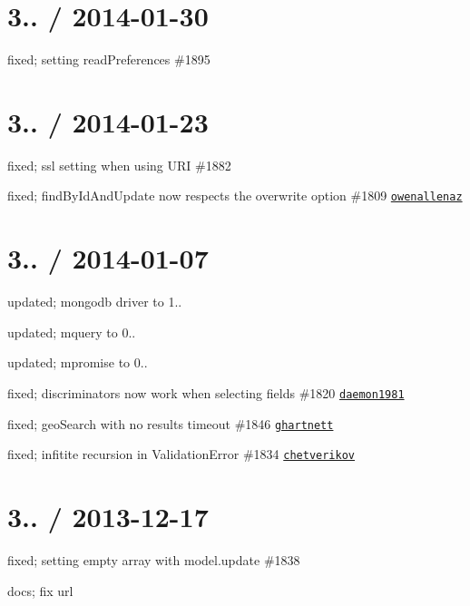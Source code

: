 \section*{3.. / 2014-\/01-\/30 }


\begin{DoxyItemize}
\item fixed; setting read\+Preferences \#1895
\end{DoxyItemize}

\section*{3.. / 2014-\/01-\/23 }


\begin{DoxyItemize}
\item fixed; ssl setting when using U\+RI \#1882
\item fixed; find\+By\+Id\+And\+Update now respects the overwrite option \#1809 \href{https://github.com/owenallenaz}{\tt owenallenaz}
\end{DoxyItemize}

\section*{3.. / 2014-\/01-\/07 }


\begin{DoxyItemize}
\item updated; mongodb driver to 1..
\item updated; mquery to 0..
\item updated; mpromise to 0..
\item fixed; discriminators now work when selecting fields \#1820 \href{https://github.com/daemon1981}{\tt daemon1981}
\item fixed; geo\+Search with no results timeout \#1846 \href{https://github.com/ghartnett}{\tt ghartnett}
\item fixed; infitite recursion in Validation\+Error \#1834 \href{https://github.com/chetverikov}{\tt chetverikov}
\end{DoxyItemize}

\section*{3.. / 2013-\/12-\/17 }


\begin{DoxyItemize}
\item fixed; setting empty array with model.\+update \#1838
\item docs; fix url
\end{DoxyItemize}

